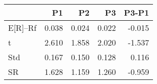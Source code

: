 \begin{tabular}{lrrrr}
\toprule
 & P1 & P2 & P3 & P3-P1 \\
\midrule
E[R]--Rf & 0.038 & 0.024 & 0.022 & -0.015 \\
t & 2.610 & 1.858 & 2.020 & -1.537 \\
Std & 0.167 & 0.150 & 0.128 & 0.116 \\
SR & 1.628 & 1.159 & 1.260 & -0.959 \\
\bottomrule
\end{tabular}
